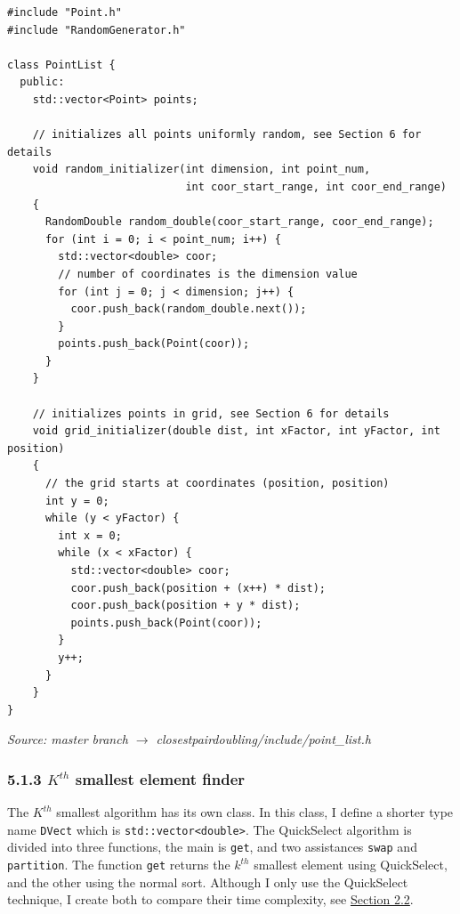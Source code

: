 \documentclass[12pt,english,]{article}
\newcommand{\code}[1]{\colorbox{light-gray}{\texttt{#1}}}
\begin{document}
\begin{lstlisting}
#include "Point.h"
#include "RandomGenerator.h"

class PointList {
  public:
    std::vector<Point> points;

    // initializes all points uniformly random, see Section 6 for details 
    void random_initializer(int dimension, int point_num,
                            int coor_start_range, int coor_end_range)
    {
      RandomDouble random_double(coor_start_range, coor_end_range);
      for (int i = 0; i < point_num; i++) {
        std::vector<double> coor;
        // number of coordinates is the dimension value
        for (int j = 0; j < dimension; j++) {
          coor.push_back(random_double.next());
        }
        points.push_back(Point(coor));
      }
    }

    // initializes points in grid, see Section 6 for details 
    void grid_initializer(double dist, int xFactor, int yFactor, int position)
    {
      // the grid starts at coordinates (position, position)
      int y = 0;
      while (y < yFactor) {
        int x = 0;
        while (x < xFactor) {
          std::vector<double> coor;
          coor.push_back(position + (x++) * dist);
          coor.push_back(position + y * dist);
          points.push_back(Point(coor));
        }
        y++;
      }
    }
}
\end{lstlisting}
\vspace{-9truemm}
\begin{minipage}{1\textwidth}
  \begin{flushright}
  {\footnotesize \emph{Source: master branch $\rightarrow$ closestpairdoubling/include/point\_list.h}\par}
  \end{flushright}
\end{minipage}

\hypertarget{section5.1.3}{%
\subsubsection{\texorpdfstring{5.1.3 \(K^{th}\) smallest element
finder}{5.1.3 K\^{}\{th\} smallest element finder}}\label{section5.1.3}}

The \(K^{th}\) smallest algorithm has its own class. In this class, I
define a shorter type name \code{DVect} which is
\code{std::vector<double>}. The QuickSelect algorithm is divided into
three functions, the main is \code{get}, and two assistances \code{swap}
and \code{partition}. The function \code{get} returns the \(k^{th}\)
smallest element using QuickSelect, and the other using the normal sort.
Although I only use the QuickSelect technique, I create both to compare
their time complexity, see \protect\hyperlink{section2.2}{Section 2.2}.
\end{document}
